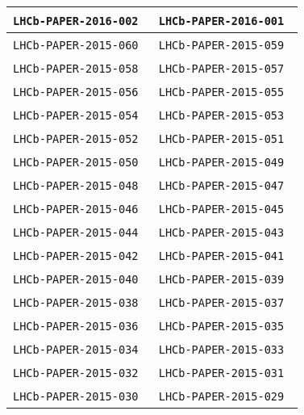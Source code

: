 \begin{center}
\begin{longtable}{ll}
\texttt{LHCb-PAPER-2016-002}~\cite{LHCb-PAPER-2016-002} &
\texttt{LHCb-PAPER-2016-001}~\cite{LHCb-PAPER-2016-001} \\
\hline
\texttt{LHCb-PAPER-2015-060}~\cite{LHCb-PAPER-2015-060} &
\texttt{LHCb-PAPER-2015-059}~\cite{LHCb-PAPER-2015-059} \\
\texttt{LHCb-PAPER-2015-058}~\cite{LHCb-PAPER-2015-058} &
\texttt{LHCb-PAPER-2015-057}~\cite{LHCb-PAPER-2015-057} \\
\texttt{LHCb-PAPER-2015-056}~\cite{LHCb-PAPER-2015-056} &
\texttt{LHCb-PAPER-2015-055}~\cite{LHCb-PAPER-2015-055} \\
\texttt{LHCb-PAPER-2015-054}~\cite{LHCb-PAPER-2015-054} &
\texttt{LHCb-PAPER-2015-053}~\cite{LHCb-PAPER-2015-053} \\
\texttt{LHCb-PAPER-2015-052}~\cite{LHCb-PAPER-2015-052} &
\texttt{LHCb-PAPER-2015-051}~\cite{LHCb-PAPER-2015-051} \\
\texttt{LHCb-PAPER-2015-050}~\cite{LHCb-PAPER-2015-050} &
\texttt{LHCb-PAPER-2015-049}~\cite{LHCb-PAPER-2015-049} \\
\texttt{LHCb-PAPER-2015-048}~\cite{LHCb-PAPER-2015-048} &
\texttt{LHCb-PAPER-2015-047}~\cite{LHCb-PAPER-2015-047} \\
\texttt{LHCb-PAPER-2015-046}~\cite{LHCb-PAPER-2015-046} &
\texttt{LHCb-PAPER-2015-045}~\cite{LHCb-PAPER-2015-045} \\
\texttt{LHCb-PAPER-2015-044}~\cite{LHCb-PAPER-2015-044} &
\texttt{LHCb-PAPER-2015-043}~\cite{LHCb-PAPER-2015-043} \\
\texttt{LHCb-PAPER-2015-042}~\cite{LHCb-PAPER-2015-042} &
\texttt{LHCb-PAPER-2015-041}~\cite{LHCb-PAPER-2015-041} \\
\texttt{LHCb-PAPER-2015-040}~\cite{LHCb-PAPER-2015-040} &
\texttt{LHCb-PAPER-2015-039}~\cite{LHCb-PAPER-2015-039} \\
\texttt{LHCb-PAPER-2015-038}~\cite{LHCb-PAPER-2015-038} &
\texttt{LHCb-PAPER-2015-037}~\cite{LHCb-PAPER-2015-037} \\
\texttt{LHCb-PAPER-2015-036}~\cite{LHCb-PAPER-2015-036} &
\texttt{LHCb-PAPER-2015-035}~\cite{LHCb-PAPER-2015-035} \\
\texttt{LHCb-PAPER-2015-034}~\cite{LHCb-PAPER-2015-034} &
\texttt{LHCb-PAPER-2015-033}~\cite{LHCb-PAPER-2015-033} \\
\texttt{LHCb-PAPER-2015-032}~\cite{LHCb-PAPER-2015-032} &
\texttt{LHCb-PAPER-2015-031}~\cite{LHCb-PAPER-2015-031} \\
\texttt{LHCb-PAPER-2015-030}~\cite{LHCb-PAPER-2015-030} &
\texttt{LHCb-PAPER-2015-029}~\cite{LHCb-PAPER-2015-029} \\

\end{longtable}
\end{center}
